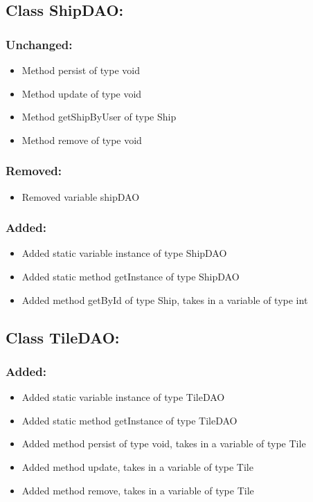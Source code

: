 \documentclass{article}
\begin{document}

\subsection{Class ShipDAO:}

\subsubsection{Unchanged:}
\begin{itemize}
\item Method persist of type void
\item Method update of type void
\item Method getShipByUser of type Ship
\item Method remove of type void
\end{itemize}

\subsubsection{Removed:}
\begin{itemize}
\item Removed variable shipDAO
\end{itemize}

\subsubsection{Added:}
\begin{itemize}
\item Added static variable instance of type ShipDAO
\item Added static method getInstance of type ShipDAO
\item Added method getById of type Ship, takes in a variable of type int
\end{itemize}


\subsection{Class TileDAO:}

\subsubsection{Added:}
\begin{itemize}
\item Added static variable instance of type TileDAO
\item Added static method getInstance of type TileDAO
\item Added method persist of type void, takes in a variable of type Tile
\item Added method update, takes in a variable of type Tile
\item Added method remove, takes in a variable of type Tile
\end{itemize}
\end{document}
